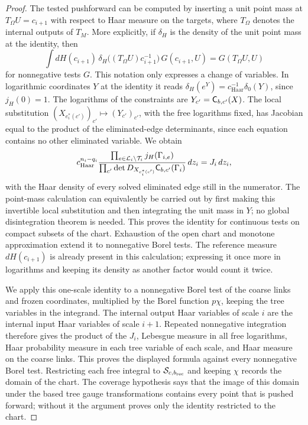 \begin{proof}
The tested pushforward can be computed by inserting a unit point mass at $T_\Omega U=c_{i+1}$ with respect to Haar measure on the targets, where $T_\Omega$ denotes the internal outputs of $T_M$. More explicitly, if $\delta_H$ is the density of the unit point mass at the identity, then
\[
 \int dH(c_{i+1})\,
  \delta_H\bigl((T_\Omega U)c_{i+1}^{-1}\bigr)\,G(c_{i+1},U)
                =G(T_\Omega U,U)
\]
for nonnegative tests $G$. This notation only expresses a change of variables. In logarithmic coordinates $Y$ at the identity it reads $\delta_H(e^Y)=c_{\mathrm{Haar}}^{-1}\delta_0(Y)$, since $j_H(0)=1$. The logarithms of the constraints are $Y_{c'}=\mathsf C_{b,c'}(X)$. The local substitution $(X_{e^*_i(c')})_{c'}\mapsto(Y_{c'})_{c'}$, with the free logarithms fixed, has Jacobian equal to the product of the eliminated-edge determinants, since each equation contains no other eliminated variable. We obtain
\[
 c_{\mathrm{Haar}}^{n_i-q_i}
   \frac{\prod_{e\in\mathcal L_i\setminus\mathcal T_i}j_H(\Gamma_{i,e})}
        {\prod_{c'}\det D_{X_{e^*_i(c')}}
                      \mathsf C_{b,c'}(\Gamma_i)}\,dz_i
   =J_i\,dz_i,
\]
with the Haar density of every solved eliminated edge still in the numerator. The point-mass calculation can equivalently be carried out by first making this invertible local substitution and then integrating the unit mass in $Y$; no global disintegration theorem is needed. This proves the identity for continuous tests on compact subsets of the chart. Exhaustion of the open chart and monotone approximation extend it to nonnegative Borel tests. The reference measure $dH(c_{i+1})$ is already present in this calculation; expressing it once more in logarithms and keeping its density as another factor would count it twice.

We apply this one-scale identity to a nonnegative Borel test of the coarse links and frozen coordinates, multiplied by the Borel function $p\chi$, keeping the tree variables in the integrand. The internal output Haar variables of scale $i$ are the internal input Haar variables of scale $i+1$. Repeated nonnegative integration therefore gives the product of the $J_i$, Lebesgue measure in all free logarithms, Haar probability measure in each tree variable of each scale, and Haar measure on the coarse links. This proves the displayed formula against every nonnegative Borel test. Restricting each free integral to $\mathcal S_{c,b_{\mathrm{rec}}}$ and keeping $\chi$ records the domain of the chart. The coverage hypothesis says that the image of this domain under the based tree gauge transformations contains every point that is pushed forward; without it the argument proves only the identity restricted to the chart.


\end{proof}
